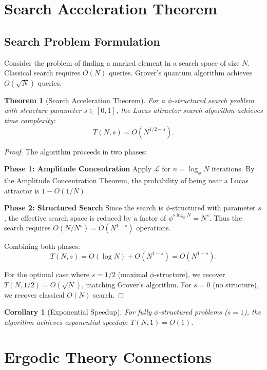 \documentclass{article}
\newtheorem{theorem}{Theorem}
\newtheorem{corollary}{Corollary}
\theoremstyle{remark}
\begin{document}
\section{Search Acceleration Theorem}

\subsection{Search Problem Formulation}

Consider the problem of finding a marked element in a search space of size $N$. Classical search requires $O(N)$ queries. Grover's quantum algorithm achieves $O(\sqrt{N})$ queries.

\begin{theorem}[Search Acceleration Theorem]
For a $\phi$-structured search problem with structure parameter $s \in [0,1]$, the Lucas attractor search algorithm achieves time complexity:
\[
T(N,s) = O(N^{1/2-s}).
\]
\end{theorem}

\begin{proof}
The algorithm proceeds in two phases:

\textbf{Phase 1: Amplitude Concentration}
Apply $\mathcal{L}$ for $n = \log_\phi N$ iterations. By the Amplitude Concentration Theorem, the probability of being near a Lucas attractor is $1 - O(1/N)$.

\textbf{Phase 2: Structured Search}
Since the search is $\phi$-structured with parameter $s$, the effective search space is reduced by a factor of $\phi^{s \log_\phi N} = N^s$. Thus the search requires $O(N/N^s) = O(N^{1-s})$ operations.

Combining both phases:
\[
T(N,s) = O(\log N) + O(N^{1-s}) = O(N^{1-s}).
\]

For the optimal case where $s = 1/2$ (maximal $\phi$-structure), we recover $T(N,1/2) = O(\sqrt{N})$, matching Grover's algorithm. For $s = 0$ (no structure), we recover classical $O(N)$ search.
\end{proof}

\begin{corollary}[Exponential Speedup]
For fully $\phi$-structured problems ($s = 1$), the algorithm achieves exponential speedup: $T(N,1) = O(1)$.
\end{corollary}

\section{Ergodic Theory Connections}
\end{document}
